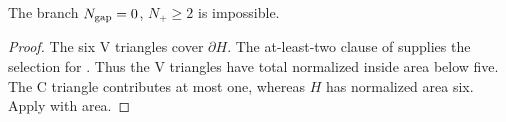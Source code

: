 \begin{proposition}
\label{prop:area-branches}
The branch $N_{\rm gap}=0$, $N_+\ge2$ is impossible.
\end{proposition}
\begin{proof}
The six V triangles cover $\partial H$. The at-least-two clause of
 supplies the selection for
. Thus the V triangles have total normalized
inside area below five. The C triangle contributes at most one, whereas
$H$ has normalized area six. Apply  with area.
\end{proof}
